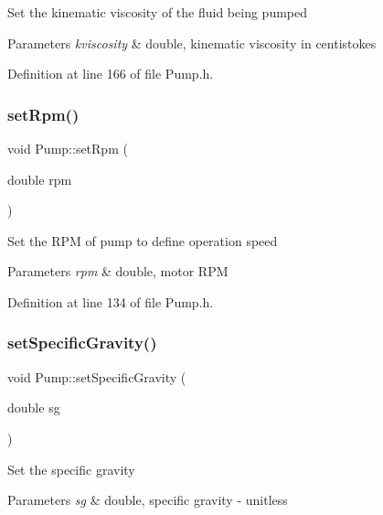 Set the kinematic viscosity of the fluid being pumped 
\begin{DoxyParams}{Parameters}
{\em kviscosity} & double, kinematic viscosity in centistokes \\
\hline
\end{DoxyParams}


Definition at line 166 of file Pump.\+h.

\mbox{\label{class_pump_a7478d85c3b89cda275b039673603a785}} 
\subsubsection{\texorpdfstring{set\+Rpm()}{setRpm()}}
{\footnotesize\ttfamily void Pump\+::set\+Rpm (\begin{DoxyParamCaption}\item[{double}]{rpm }\end{DoxyParamCaption})\hspace{0.3cm}{\ttfamily [inline]}}

Set the R\+PM of pump to define operation speed 
\begin{DoxyParams}{Parameters}
{\em rpm} & double, motor R\+PM \\
\hline
\end{DoxyParams}


Definition at line 134 of file Pump.\+h.

\mbox{\label{class_pump_a1032a4ec4dd4002889f4b848af7c9e01}} 
\subsubsection{\texorpdfstring{set\+Specific\+Gravity()}{setSpecificGravity()}}
{\footnotesize\ttfamily void Pump\+::set\+Specific\+Gravity (\begin{DoxyParamCaption}\item[{double}]{sg }\end{DoxyParamCaption})\hspace{0.3cm}{\ttfamily [inline]}}

Set the specific gravity 
\begin{DoxyParams}{Parameters}
{\em sg} & double, specific gravity -\/ unitless \\
\hline
\end{DoxyParams}


